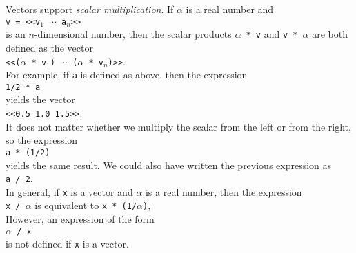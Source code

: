 Vectors support 
\href{http://en.wikipedia.org/wiki/Scalar_multiplication}{\emph{scalar multiplication}}.  If
$\alpha$ is a real number and 
\\[0.2cm]
\hspace*{1.3cm}
\texttt{v = <<v$_1$ $\cdots$ a$_n$>>}
\\[0.2cm]
is an $n$-dimensional number, then the scalar products \texttt{$\alpha$ * v} and \texttt{v * $\alpha$}
are both defined as the vector
\\[0.2cm]
\hspace*{1.3cm}
\texttt{<<($\alpha$ * v$_1$) $\cdots$ ($\alpha$ * v$_n$)>>}.
\\[0.2cm]
For example, if \texttt{a} is defined as above, then the expression
\\[0.2cm]
\hspace*{1.3cm}
\texttt{1/2 * a}
\\[0.2cm]
yields the vector
\\[0.2cm]
\hspace*{1.3cm}
\texttt{<<0.5 1.0 1.5>>}.
\\[0.2cm]
It does not matter whether we multiply the scalar from the left or from the right, so the expression
\\[0.2cm]
\hspace*{1.3cm}
\texttt{a * (1/2)}
\\[0.2cm]
yields the same result.  We could also have written the previous expression as
\\[0.2cm]
\hspace*{1.3cm}
\texttt{a / 2}.
\\[0.2cm]
In general, if \texttt{x} is a vector and $\alpha$ is a real number, then the expression
\\[0.2cm]
\hspace*{1.3cm}
\texttt{x / $\alpha$} \quad is equivalent to \quad 
\texttt{x * (1/$\alpha$)},
\\[0.2cm]
However, an expression of the form
\\[0.2cm]
\hspace*{1.3cm}
\texttt{$\alpha$ / x}
\\[0.2cm]
is not defined if \texttt{x} is a vector.

